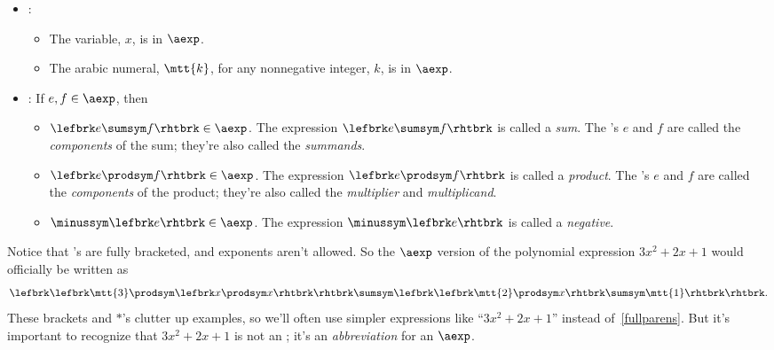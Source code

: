 \begin{definition} \mbox{}

\begin{itemize}
\item {}: \mbox{}

\begin{itemize}

\item The variable, $x$, is in $\aexp$.

\item The arabic numeral, $\mtt{k}$, for any nonnegative integer, $k$, is
  in $\aexp$.

\end{itemize}

\item {}: If $e,f \in \aexp$, then
\begin{itemize}
\setcounter{enumi}{2}

\item $\lefbrk e \sumsym f \rhtbrk \in \aexp$.  The expression $\lefbrk e \sumsym
  f \rhtbrk$ is called a \emph{sum}.  The \aexp's $e$ and $f$ are called the
  \emph{components} of the sum; they're also called the \emph{summands}.

\item $\lefbrk e \prodsym f\rhtbrk \in \aexp$.  The expression $\lefbrk e \prodsym f\rhtbrk$ is called a
  \emph{product}.  The \aexp's $e$ and $f$ are called the
  \emph{components} of the product; they're also called the
  \emph{multiplier} and \emph{multiplicand}.

\item $\minussym\lefbrk e\rhtbrk \in \aexp$.  The expression $\minussym\lefbrk e\rhtbrk$ is called a
  \emph{negative}.
\end{itemize}
\end{itemize}
\end{definition}

Notice that \aexp's are fully bracketed, and exponents aren't allowed.  So
the $\aexp$ version of the polynomial expression $3x^2 + 2x + 1$ would
officially be written as
\begin{equation}\label{fullparens}
\lefbrk \lefbrk \mtt{3} \prodsym \lefbrk x \prodsym x\rhtbrk\rhtbrk \sumsym \lefbrk \lefbrk \mtt{2} \prodsym x\rhtbrk \sumsym \mtt{1}\rhtbrk\rhtbrk.
\end{equation}
These brackets and $\ast$'s clutter up examples, so we'll often use
simpler expressions like ``$3x^2 + 2x + 1$'' instead
of~\eqref{fullparens}.  But it's important to recognize that $3x^2 +
2x + 1$ is not an \aexp; it's an \emph{abbreviation} for an $\aexp$.

